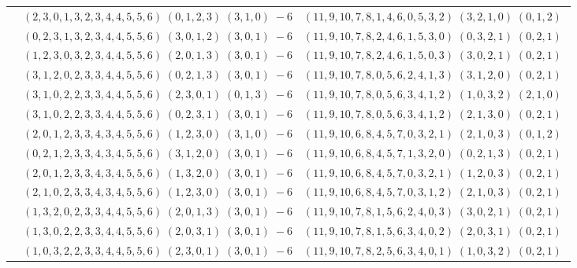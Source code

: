 \documentclass[11pt]{article}
\begin{document}
\begin{longtable}[l]{|c|c|c|}
 \cline{2-3} 
 & $(2 ,3 ,0 ,1 ,3 ,2 ,3 ,4 ,4 ,5 ,5 ,6) \;(0 ,1 ,2 ,3) \;(3 ,1 ,0) \;-6$ & $(11 ,9 ,10 ,7 ,8 ,1 ,4 ,6 ,0 ,5 ,3 ,2) \;(3 ,2 ,1 ,0) \;(0 ,1 ,2) \;$\\ 
 \cline{2-3} 
 & $(0 ,2 ,3 ,1 ,3 ,2 ,3 ,4 ,4 ,5 ,5 ,6) \;(3 ,0 ,1 ,2) \;(3 ,0 ,1) \;-6$ & $(11 ,9 ,10 ,7 ,8 ,2 ,4 ,6 ,1 ,5 ,3 ,0) \;(0 ,3 ,2 ,1) \;(0 ,2 ,1) \;$\\ 
 \cline{2-3} 
 & $(1 ,2 ,3 ,0 ,3 ,2 ,3 ,4 ,4 ,5 ,5 ,6) \;(2 ,0 ,1 ,3) \;(3 ,0 ,1) \;-6$ & $(11 ,9 ,10 ,7 ,8 ,2 ,4 ,6 ,1 ,5 ,0 ,3) \;(3 ,0 ,2 ,1) \;(0 ,2 ,1) \;$\\ 
 \cline{2-3} 
 & $(3 ,1 ,2 ,0 ,2 ,3 ,3 ,4 ,4 ,5 ,5 ,6) \;(0 ,2 ,1 ,3) \;(3 ,0 ,1) \;-6$ & $(11 ,9 ,10 ,7 ,8 ,0 ,5 ,6 ,2 ,4 ,1 ,3) \;(3 ,1 ,2 ,0) \;(0 ,2 ,1) \;$\\ 
 \cline{2-3} 
 & $(3 ,1 ,0 ,2 ,2 ,3 ,3 ,4 ,4 ,5 ,5 ,6) \;(2 ,3 ,0 ,1) \;(0 ,1 ,3) \;-6$ & $(11 ,9 ,10 ,7 ,8 ,0 ,5 ,6 ,3 ,4 ,1 ,2) \;(1 ,0 ,3 ,2) \;(2 ,1 ,0) \;$\\ 
 \cline{2-3} 
 & $(3 ,1 ,0 ,2 ,2 ,3 ,3 ,4 ,4 ,5 ,5 ,6) \;(0 ,2 ,3 ,1) \;(3 ,0 ,1) \;-6$ & $(11 ,9 ,10 ,7 ,8 ,0 ,5 ,6 ,3 ,4 ,1 ,2) \;(2 ,1 ,3 ,0) \;(0 ,2 ,1) \;$\\ 
 \cline{2-3} 
 & $(2 ,0 ,1 ,2 ,3 ,3 ,4 ,3 ,4 ,5 ,5 ,6) \;(1 ,2 ,3 ,0) \;(3 ,1 ,0) \;-6$ & $(11 ,9 ,10 ,6 ,8 ,4 ,5 ,7 ,0 ,3 ,2 ,1) \;(2 ,1 ,0 ,3) \;(0 ,1 ,2) \;$\\ 
 \cline{2-3} 
 & $(0 ,2 ,1 ,2 ,3 ,3 ,4 ,3 ,4 ,5 ,5 ,6) \;(3 ,1 ,2 ,0) \;(3 ,0 ,1) \;-6$ & $(11 ,9 ,10 ,6 ,8 ,4 ,5 ,7 ,1 ,3 ,2 ,0) \;(0 ,2 ,1 ,3) \;(0 ,2 ,1) \;$\\ 
 \cline{2-3} 
 & $(2 ,0 ,1 ,2 ,3 ,3 ,4 ,3 ,4 ,5 ,5 ,6) \;(1 ,3 ,2 ,0) \;(3 ,0 ,1) \;-6$ & $(11 ,9 ,10 ,6 ,8 ,4 ,5 ,7 ,0 ,3 ,2 ,1) \;(1 ,2 ,0 ,3) \;(0 ,2 ,1) \;$\\ 
 \cline{2-3} 
 & $(2 ,1 ,0 ,2 ,3 ,3 ,4 ,3 ,4 ,5 ,5 ,6) \;(1 ,2 ,3 ,0) \;(3 ,0 ,1) \;-6$ & $(11 ,9 ,10 ,6 ,8 ,4 ,5 ,7 ,0 ,3 ,1 ,2) \;(2 ,1 ,0 ,3) \;(0 ,2 ,1) \;$\\ 
 \cline{2-3} 
 & $(1 ,3 ,2 ,0 ,2 ,3 ,3 ,4 ,4 ,5 ,5 ,6) \;(2 ,0 ,1 ,3) \;(3 ,0 ,1) \;-6$ & $(11 ,9 ,10 ,7 ,8 ,1 ,5 ,6 ,2 ,4 ,0 ,3) \;(3 ,0 ,2 ,1) \;(0 ,2 ,1) \;$\\ 
 \cline{2-3} 
 & $(1 ,3 ,0 ,2 ,2 ,3 ,3 ,4 ,4 ,5 ,5 ,6) \;(2 ,0 ,3 ,1) \;(3 ,0 ,1) \;-6$ & $(11 ,9 ,10 ,7 ,8 ,1 ,5 ,6 ,3 ,4 ,0 ,2) \;(2 ,0 ,3 ,1) \;(0 ,2 ,1) \;$\\ 
 \cline{2-3} 
 & $(1 ,0 ,3 ,2 ,2 ,3 ,3 ,4 ,4 ,5 ,5 ,6) \;(2 ,3 ,0 ,1) \;(3 ,0 ,1) \;-6$ & $(11 ,9 ,10 ,7 ,8 ,2 ,5 ,6 ,3 ,4 ,0 ,1) \;(1 ,0 ,3 ,2) \;(0 ,2 ,1) \;$\\ 

\end{longtable}
\end{document}
